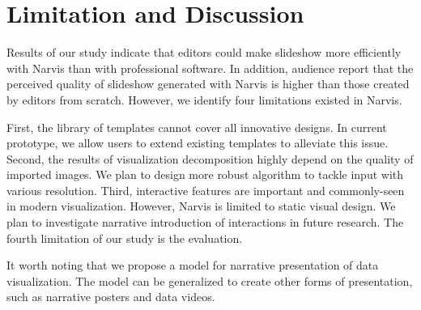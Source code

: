 \section{Limitation and Discussion}

Results of our study indicate that editors could make slideshow more efficiently with Narvis than with professional software. In addition, audience report that the perceived quality of slideshow generated with Narvis is higher than those created by editors from scratch. However, we identify four limitations existed in Narvis.

First, the library of templates cannot cover all innovative designs. In current prototype, we allow users to extend existing templates to alleviate this issue. 
Second, the results of visualization decomposition highly depend on the quality of imported images. We plan to design more robust algorithm to tackle input with various resolution.
Third, interactive features are important and commonly-seen in modern visualization. However, Narvis is limited to static visual design. We plan to investigate narrative introduction of interactions in future research. The fourth limitation of our study is the evaluation. 

It worth noting that we propose a model for narrative presentation of data visualization. The model can be generalized to create other forms of presentation, such as narrative posters and data videos. 




